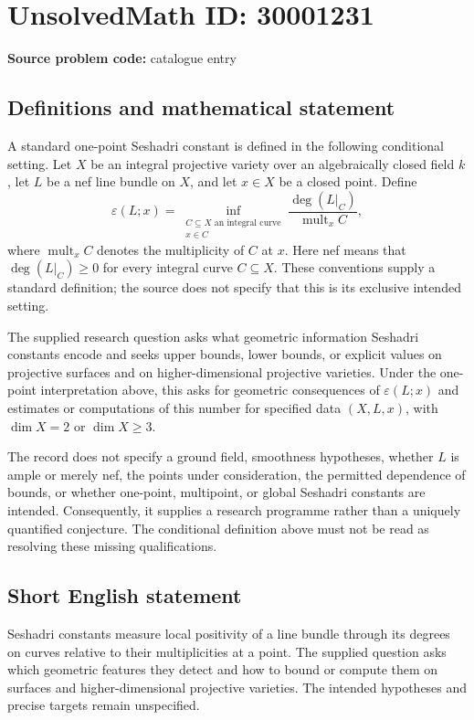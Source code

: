 \documentclass[11pt]{article}
\begin{document}
\section*{UnsolvedMath ID: 30001231}
\textbf{Source problem code:} catalogue entry
\subsection{Definitions and mathematical statement}
A standard one-point Seshadri constant is defined in the following conditional setting. Let \(X\) be an integral projective variety over an algebraically closed field \(k\), let \(L\) be a nef line bundle on \(X\), and let \(x\in X\) be a closed point. Define
\[
\varepsilon(L;x)=\inf_{\substack{C\subseteq X\text{ an integral curve}\\x\in C}}\frac{\deg(L|_C)}{\operatorname{mult}_x C},
\]
where \(\operatorname{mult}_x C\) denotes the multiplicity of \(C\) at \(x\). Here nef means that \(\deg(L|_C)\geq 0\) for every integral curve \(C\subseteq X\). These conventions supply a standard definition; the source does not specify that this is its exclusive intended setting.

The supplied research question asks what geometric information Seshadri constants encode and seeks upper bounds, lower bounds, or explicit values on projective surfaces and on higher-dimensional projective varieties. Under the one-point interpretation above, this asks for geometric consequences of \(\varepsilon(L;x)\) and estimates or computations of this number for specified data \((X,L,x)\), with \(\dim X=2\) or \(\dim X\geq 3\).

The record does not specify a ground field, smoothness hypotheses, whether \(L\) is ample or merely nef, the points under consideration, the permitted dependence of bounds, or whether one-point, multipoint, or global Seshadri constants are intended. Consequently, it supplies a research programme rather than a uniquely quantified conjecture. The conditional definition above must not be read as resolving these missing qualifications.
\subsection{Short English statement}
Seshadri constants measure local positivity of a line bundle through its degrees on curves relative to their multiplicities at a point. The supplied question asks which geometric features they detect and how to bound or compute them on surfaces and higher-dimensional projective varieties. The intended hypotheses and precise targets remain unspecified.
\end{document}
